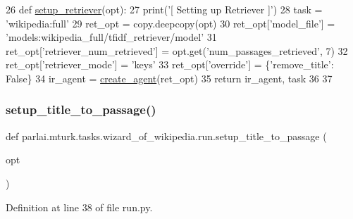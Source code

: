 \begin{DoxyCode}
26 \textcolor{keyword}{def }\hyperlink{namespaceparlai_1_1mturk_1_1tasks_1_1wizard__of__wikipedia_1_1run_a22eb017ecd8f1a211fc5aac511d3102e}{setup\_retriever}(opt):
27     print(\textcolor{stringliteral}{'[ Setting up Retriever ]'})
28     task = \textcolor{stringliteral}{'wikipedia:full'}
29     ret\_opt = copy.deepcopy(opt)
30     ret\_opt[\textcolor{stringliteral}{'model\_file'}] = \textcolor{stringliteral}{'models:wikipedia\_full/tfidf\_retriever/model'}
31     ret\_opt[\textcolor{stringliteral}{'retriever\_num\_retrieved'}] = opt.get(\textcolor{stringliteral}{'num\_passages\_retrieved'}, 7)
32     ret\_opt[\textcolor{stringliteral}{'retriever\_mode'}] = \textcolor{stringliteral}{'keys'}
33     ret\_opt[\textcolor{stringliteral}{'override'}] = \{\textcolor{stringliteral}{'remove\_title'}: \textcolor{keyword}{False}\}
34     ir\_agent = \hyperlink{namespaceparlai_1_1core_1_1agents_a00d77a7e26fb89e8bd900f7b2a02982a}{create\_agent}(ret\_opt)
35     \textcolor{keywordflow}{return} ir\_agent, task
36 
37 
\end{DoxyCode}
\mbox{\label{namespaceparlai_1_1mturk_1_1tasks_1_1wizard__of__wikipedia_1_1run_a59836c3be93d4b491fa9ddecbb4e83c0}} 
\subsubsection{\texorpdfstring{setup\+\_\+title\+\_\+to\+\_\+passage()}{setup\_title\_to\_passage()}}
{\footnotesize\ttfamily def parlai.\+mturk.\+tasks.\+wizard\+\_\+of\+\_\+wikipedia.\+run.\+setup\+\_\+title\+\_\+to\+\_\+passage (\begin{DoxyParamCaption}\item[{}]{opt }\end{DoxyParamCaption})}



Definition at line 38 of file run.\+py.


